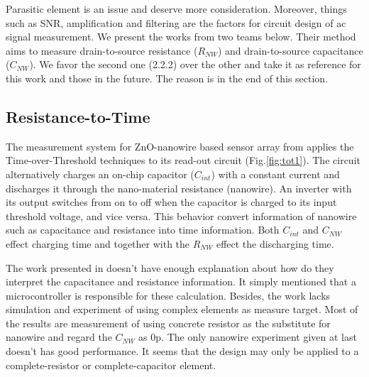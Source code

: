 Parasitic element is an issue and deserve more consideration.
Moreover, things such as SNR, amplification and filtering are the factors for circuit design of ac signal measurement.
We present the works from two teams below.
Their method aims to measure drain-to-source resistance ($R_{NW}$) and drain-to-source capacitance ($C_{NW}$).
We favor the second one (2.2.2) over the other and take it as reference for this work and those in the future.
The reason is in the end of this section.

\subsection{{\color{red}Resistance-to-Time}}
The measurement system for ZnO-nanowire based sensor array from \cite{Juv1} applies the Time-over-Threshold techniques to its read-out circuit (Fig.\ref{fig:tot1}).
The circuit alternatively charges an on-chip capacitor ($C_{int}$) with a constant current and discharges it through the nano-material resistance (nanowire).
An inverter with its output switches from on to off when the capacitor is charged to its input threshold voltage, and vice versa.
This behavior convert information of nanowire such as capacitance and resistance into time information.
Both $C_{int}$ and $C_{NW}$ effect charging time and together with the $R_{NW}$ effect the discharging time.

The work presented in \cite{Juv1} doesn't have enough explanation about how do they interpret the capacitance and resistance information.
It simply mentioned that a microcontroller is responsible for these calculation.
Besides, the work lacks simulation and experiment of using complex elements as measure target.
Most of the results are measurement of using concrete resistor as the substitute for nanowire and regard the $C_{NW}$ as 0p.
The only nanowire experiment given at last doesn't has good performance.
It seems that the design may only be applied to a complete-resistor or complete-capacitor element.

